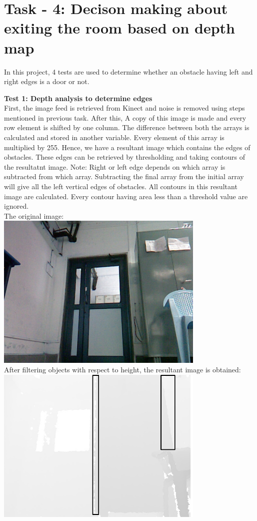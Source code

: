 \documentclass{report}
\begin{document}
\section{Task - 4: Decison making about exiting the room based on depth map}

In this project, 4 tests are used to determine whether an obstacle having left and right edges is a door or not.

\textbf{Test 1: Depth analysis to determine edges} \\

First, the image feed is retrieved from Kinect and noise is removed using steps mentioned in previous task. After this,
 A copy of this image is made and every row element is shifted by one column. The difference between both the arrays is calculated and stored in another variable. 
 Every element of this array is multiplied by 255. Hence, we have a resultant image which contains 
 the edges of obstacles. These edges can be retrieved by thresholding and taking contours of the 
 resultatnt image. Note: Right or left edge depends on which array is subtracted from which array. 
 Subtracting the final array from the initial array will give all the left vertical edges of obstacles. 
 All contours in this resultant image are calculated. Every contour having area less than a threshold value are ignored. \\
 
 The original image: \\
 \includegraphics[width = 10cm]{reference.jpg} \\
After filtering objects with respect to 
 height, the resultant image is obtained: \\
\includegraphics[width = 10cm]{result.jpg} \\
\end{document}
